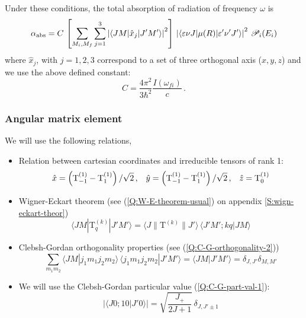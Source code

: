 Under these conditions, the total absorption of radiation of frequency $\omega$ is 
\begin{equation}\label{Q:absorption-1}
  \alpha_{\text{abs}}= C \, \left[ \sum_{M_{i}, M_{f}} \sum_{j=1}^{3} \left|\left\langle J M | \hat{x}_{j} | J' M' \right\rangle \right|^{2} \right]\, \left|\left\langle \varepsilon \nu J | \mu(R) | \varepsilon' \nu' J' \right\rangle\right|^{2} \, \mathcal{P}_{i}(E_{i})
\end{equation}
where $\hat{x}_{j}$, with $j=1,2,3$ correspond to a set of three orthogonal axis ($x,y,z$) and we use the above defined constant:
\begin{equation*}
  C = \frac{4 \pi^{2}}{3 \hbar^{2}} \frac{I(\omega_{fi})}{c} \,.
\end{equation*}

\subsubsection{Angular matrix element}
\label{S:angul-matr-elem}

\setlength{\aclaracionwidth}{\textwidth}
\begin{aclaracion}[]
  We will use the following relations,
  \begin{itemize}
  \item Relation between cartesian coordinates and irreducible tensors of rank 1:
    \begin{align}\label{Q:coord-tensor-relation}
      \hat{x} = \left( \mathrm{T}^{(1)}_{-1} - \mathrm{T}^{(1)}_{1} \right)/\sqrt{2} \,, & &\hat{y} = \left( \mathrm{T}^{(1)}_{-1} - \mathrm{T}^{(1)}_{1} \right)/\sqrt{2} \,, & &\hat{z} = \mathrm{T}^{(1)}_{0}
    \end{align}
  \item Wigner-Eckart theorem (see (\ref{Q:W-E-theorem-usual}) on appendix \ref{S:wign-eckart-theor})
    \begin{equation}\label{Q:W-E-theorem-1}
      \langle JM|\mathrm{T}^{(k)}_q|J'M'\rangle = \langle J\|\mathrm{T}^{(k)} \|J' \rangle \, \langle J'M';kq|JM \rangle 
    \end{equation}

  \item Clebsh-Gordan orthogonality properties (see (\ref{Q:C-G-orthogonality-2}))
      \begin{equation}\label{Q:C-G-eq-orthog}
 \sum_{m_1m_2} \langle J M|j_1 m_1 j_2 m_2\rangle \, \langle j_1 m_1 j_2 m_2|J' M'\rangle  = \langle J M | J' M'\rangle = \delta_{J,J'}\delta_{M,M'}
      \end{equation}

    \item We will use the Clebsh-Gordan particular value (\ref{Q:C-G-part-val-1}):
\begin{equation}\label{Q:C-G-j1j}
  \left|\langle J 0; 1 0 | J' 0 \rangle\right| =  \sqrt{\frac{J_{+}}{2 J + 1}} \, \delta_{J,J' \pm 1}
\end{equation}
  \end{itemize}
\end{aclaracion}
%

